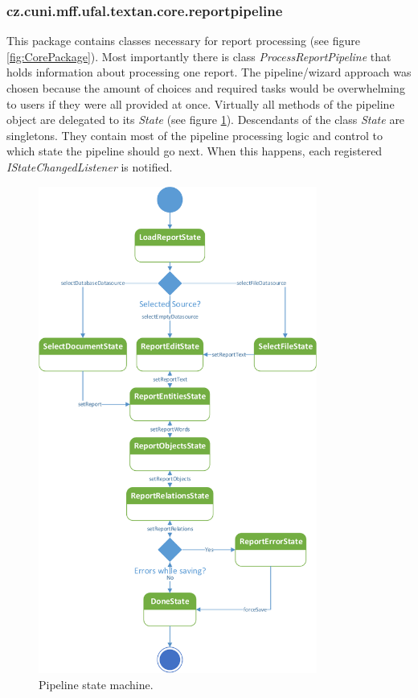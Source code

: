 \subsubsection{cz.cuni.mff.ufal.textan.core.reportpipeline}
\label{sssec:ReportPipeline}

This package contains classes necessary for report processing (see figure
\ref{fig:CorePackage}). Most importantly there is class
\emph{ProcessReportPipeline} that holds information about processing one report.
The pipeline/wizard approach was chosen because the amount of choices and
required tasks would be overwhelming to users if they were all provided at once.
Virtually all methods of the pipeline object are delegated to its \emph{State}
(see figure \ref{fig:Pipeline}). Descendants of the class \emph{State} are
singletons. They contain most of the pipeline processing logic and control to
which state the pipeline should go next. When this happens, each registered
\emph{IStateChangedListener} is notified.

\begin{figure}[!htb]
        \centering
        \includegraphics[height=16cm]{Images/Pipeline}
        \caption{Pipeline state machine.}
        \label{fig:Pipeline}
\end{figure}

